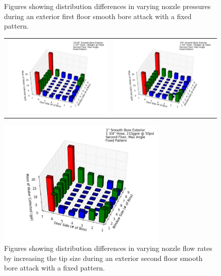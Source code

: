 \documentclass{article}
\begin{document}
\begin{figure}[ht]
\begin{tabular*}{\textwidth}{lr}
\end{tabular*}
\caption{Figures showing distribution differences in varying nozzle pressures during an exterior first floor smooth bore attack with a fixed pattern.}
\label{fig:Exterior_First_Floor_Varying_Nozzle_Pressure_SB_Fixed_Pattern}
\end{figure}

\clearpage

\begin{figure}[ht]
\begin{tabular*}{\textwidth}{lr}
\includegraphics[width=3.2in]{../ADD_Analysis/Figures/15-12-07_111118_Datafile_15_16in_Smooth_Bore_Exterior.png} &
\includegraphics[width=3.2in]{../ADD_Analysis/Figures/15-12-07_143141_Datafile_7_8in_Smooth_Bore_Exterior.png} \\
\end{tabular*}
\centering
\includegraphics[width=3.2in]{../ADD_Analysis/Figures/15-12-07_143828_Datafile_1in_Smooth_Bore_Exterior.png}
\caption{Figures showing distribution differences in varying nozzle flow rates by increasing the tip size during an exterior second floor smooth bore attack with a fixed pattern.}
\label{fig:Exterior_Second_Floor_Varying_Flow_Rates_SB_Fixed_Pattern}
\end{figure}
\end{document}
